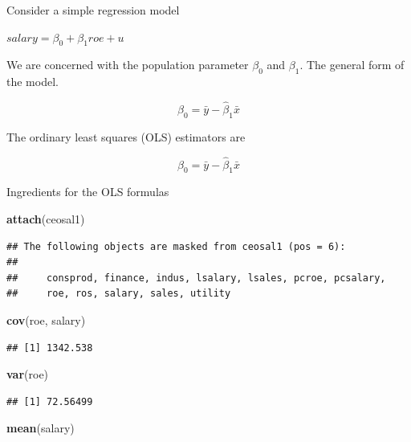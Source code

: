 \documentclass[]{book}
\newenvironment{Shaded}{\begin{snugshade}}{\end{snugshade}}
\newcommand{\KeywordTok}[1]{\textcolor[rgb]{0.13,0.29,0.53}{\textbf{#1}}}
\newcommand{\NormalTok}[1]{#1}
\begin{document}
Consider a simple regression model

\(salary = \beta_0 + \beta_1roe + u\)

We are concerned with the population parameter \(\beta_{0}\) and
\(\beta_{1}\). The general form of the model.

\begin{equation}
\hat{\beta}_{0} = \bar{y} - \hat{\beta}_{1}\bar{x}
\label{eq:populationparameterBeta0}
\end{equation}

The ordinary least squares (OLS) estimators are

\begin{equation}
\hat{\beta}_{0} = \bar{y} - \hat{\beta}_{1}\bar{x}
\label{eq:OLSestimator}
\end{equation}

Ingredients for the OLS formulas

\begin{Shaded}
\begin{Highlighting}[]
\KeywordTok{attach}\NormalTok{(ceosal1)}
\end{Highlighting}
\end{Shaded}

\begin{verbatim}
## The following objects are masked from ceosal1 (pos = 6):
## 
##     consprod, finance, indus, lsalary, lsales, pcroe, pcsalary,
##     roe, ros, salary, sales, utility
\end{verbatim}

\begin{Shaded}
\begin{Highlighting}[]
\KeywordTok{cov}\NormalTok{(roe, salary)}
\end{Highlighting}
\end{Shaded}

\begin{verbatim}
## [1] 1342.538
\end{verbatim}

\begin{Shaded}
\begin{Highlighting}[]
\KeywordTok{var}\NormalTok{(roe)}
\end{Highlighting}
\end{Shaded}

\begin{verbatim}
## [1] 72.56499
\end{verbatim}

\begin{Shaded}
\begin{Highlighting}[]
\KeywordTok{mean}\NormalTok{(salary)}
\end{Highlighting}
\end{Shaded}
\end{document}
